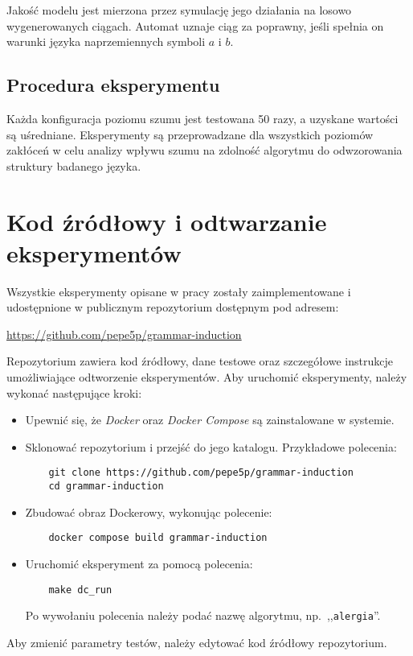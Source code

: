 Jakość modelu jest mierzona przez symulację jego działania na losowo wygenerowanych ciągach. Automat uznaje ciąg za poprawny, jeśli spełnia on warunki języka naprzemiennych symboli \( a \) i \( b \).  

\subsection{Procedura eksperymentu}  
Każda konfiguracja poziomu szumu jest testowana 50 razy, a uzyskane wartości są uśredniane. Eksperymenty są przeprowadzane dla wszystkich poziomów zakłóceń w celu analizy wpływu szumu na zdolność algorytmu do odwzorowania struktury badanego języka.  


\section{Kod źródłowy i odtwarzanie eksperymentów}  
\label{sec:code}  

Wszystkie eksperymenty opisane w pracy zostały zaimplementowane i udostępnione w publicznym repozytorium dostępnym pod adresem:  
\begin{center}  
\url{https://github.com/pepe5p/grammar-induction}  
\end{center}  

Repozytorium zawiera kod źródłowy, dane testowe oraz szczegółowe instrukcje umożliwiające odtworzenie eksperymentów. Aby uruchomić eksperymenty, należy wykonać następujące kroki:  
\begin{itemize}  
    \item Upewnić się, że \textit{Docker} oraz \textit{Docker Compose} są zainstalowane w systemie.  
    \item Sklonować repozytorium i przejść do jego katalogu. Przykładowe polecenia:  
    \begin{verbatim}
    git clone https://github.com/pepe5p/grammar-induction
    cd grammar-induction
    \end{verbatim} 
    \item Zbudować obraz Dockerowy, wykonując polecenie:  
    \begin{verbatim}
    docker compose build grammar-induction
    \end{verbatim}  
    \item Uruchomić eksperyment za pomocą polecenia:  
    \begin{verbatim}
    make dc_run
    \end{verbatim}
    Po wywołaniu polecenia należy podać nazwę algorytmu, np.\ ,,\texttt{alergia}''.
\end{itemize} 

Aby zmienić parametry testów, należy edytować kod źródłowy repozytorium.

